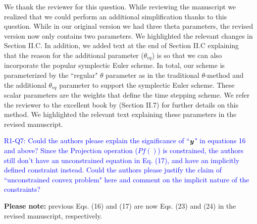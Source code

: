 We thank the reviewer for this question. While reviewing the manuscript we
realized that we could perform an additional simplification thanks to this
question. While in our original version we had three theta parameters, the
revised version now only contains two parameters. We highlighted the relevant changes
in Section II.C. In addition, we added text at the end of Section II.C
explaining that the reason for the additional parameter ($\theta_{vq}$) is so
that we can also incorporate the popular symplectic Euler scheme. In total, our
scheme is parameterized by the ``regular" $\theta$ parameter as in the
traditional $\theta$-method and the additional $\theta_{vq}$ parameter to
support the symplectic Euler scheme. These scalar parameters are the weights
that define the time stepping scheme. We refer the reviewer to the excellent
book by
\cite{bib:hairer2008solving}
(Section II.7) for further details on this method. We highlighted the relevant text
explaining these parameters in the revised manuscript.
\vspace{5mm}

\textcolor{blue}{R1-Q7: Could the authors please explain the significance of
``${\bm{y}}$" in equations 16 and above? Since the Projection operation ($Pf()$)
is constrained, the authors still don't have an unconstrained equation in Eq.
(17), and have an implicitly defined constraint instead. Could the authors
please justify the claim of ``unconstrained convex problem" here and comment on
the implicit nature of the constraints?}

\textbf{Please note:} previous Eqs. (16) and (17) are now Eqs. (23) and (24)
in the revised manuscript, respectively.

